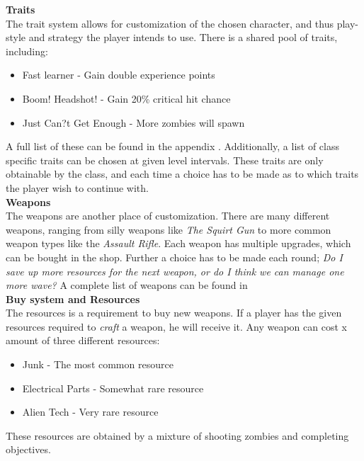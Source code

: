 \textbf{Traits}\label{gamedesign:ourgame:traits}\\
The trait system allows for customization of the chosen character, and thus play-style and strategy the player intends to use.
There is a shared pool of traits, including:
\begin{itemize}
\item Fast learner - Gain double experience points
\item Boom! Headshot!  - Gain 20\% critical hit chance
\item Just Can?t Get Enough - More zombies will spawn
\end{itemize} 
A full list of these can be found in the appendix .
Additionally, a list of class specific traits can be chosen at given level intervals. 
These traits are only obtainable by the class, and each time a choice has to be made as to which traits the player wish to continue with.\\

\textbf{Weapons}\label{gamedesign:ourgame:weapons}\\
The weapons are another place of customization.
There are many different weapons, ranging from silly weapons like \emph{The Squirt Gun} to more common weapon types like the \emph{Assault Rifle}.
Each weapon has multiple upgrades, which can be bought in the shop.
Further a choice has to be made each round; \emph{Do I save up more resources for the next weapon, or do I think we can manage one more wave?} A complete list of weapons can be found in \appendix{}\\

\textbf{Buy system and Resources}\label{gamedesign:ourgame:crafting}\\
The resources is a requirement to buy new weapons.
If a player has the given resources required to \emph{craft} a weapon, he will receive it.
Any weapon can cost x amount of three different resources:
\begin{itemize}
\item Junk - The most common resource
\item Electrical Parts - Somewhat rare resource
\item Alien Tech - Very rare resource 
\end{itemize}
These resources are obtained by a mixture of shooting zombies and completing objectives.\\

